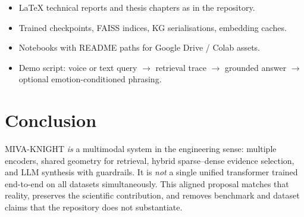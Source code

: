 \documentclass[12pt,a4paper]{article}
\begin{document}
\begin{itemize}[nosep]
  \item LaTeX technical reports and thesis chapters as in the repository.
  \item Trained checkpoints, FAISS indices, KG serialisations, embedding caches.
  \item Notebooks with README paths for Google Drive / Colab assets.
  \item Demo script: voice or text query $\rightarrow$ retrieval trace $\rightarrow$
        grounded answer $\rightarrow$ optional emotion-conditioned phrasing.
\end{itemize}

\section{Conclusion}

MIVA-KNIGHT \emph{is} a multimodal system in the engineering sense: multiple encoders,
shared geometry for retrieval, hybrid sparse--dense evidence selection, and LLM
synthesis with guardrails. It is \emph{not} a single unified transformer trained
end-to-end on all datasets simultaneously. This aligned proposal matches that reality,
preserves the scientific contribution, and removes benchmark and dataset claims that
the repository does not substantiate.
\end{document}
